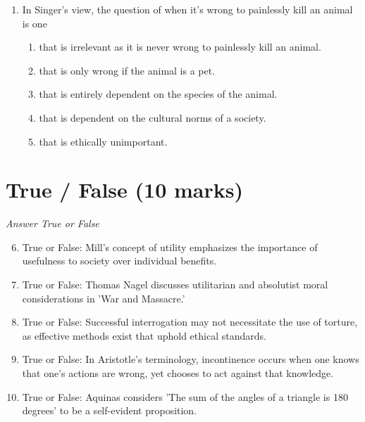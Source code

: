 \documentclass[12pt]{article}
\begin{document}
\begin{enumerate}[label=\arabic*.]
\begin{enumerate}[label=(\alph*)]
    \item the principles dictated by law.
    \item the commands of God.
    \item the principles of our elders.
\end{enumerate}
\item In Singer's view, the question of when it's wrong to painlessly kill an animal is one
\begin{enumerate}[label=(\alph*)]
    \item that is irrelevant as it is never wrong to painlessly kill an animal.
    \item that is only wrong if the animal is a pet.
    \item that is entirely dependent on the species of the animal.
    \item that is dependent on the cultural norms of a society.
    \item that is ethically unimportant.
\end{enumerate}
\end{enumerate}

\section*{True / False (10 marks)}
\textit{Answer True or False}
\begin{enumerate}[label=\arabic*.]
\setcounter{enumi}{5}
\item True or False: Mill's concept of utility emphasizes the importance of usefulness to society over individual benefits.
\item True or False: Thomas Nagel discusses utilitarian and absolutist moral considerations in 'War and Massacre.'
\item True or False: Successful interrogation may not necessitate the use of torture, as effective methods exist that uphold ethical standards.
\item True or False: In Aristotle's terminology, incontinence occurs when one knows that one's actions are wrong, yet chooses to act against that knowledge.
\item True or False: Aquinas considers 'The sum of the angles of a triangle is 180 degrees' to be a self-evident proposition.
\end{enumerate}
\end{document}
